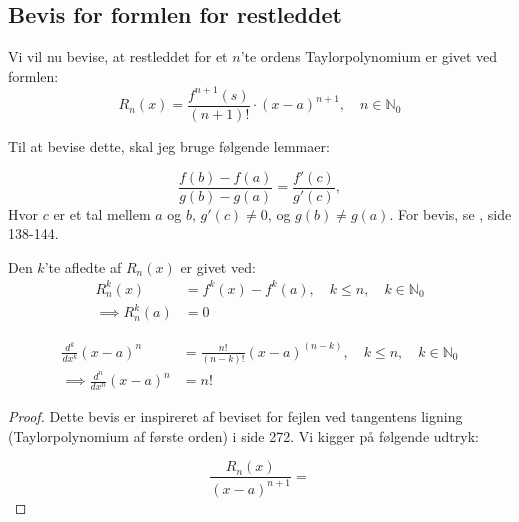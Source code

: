 \subsection{Bevis for formlen for restleddet}
Vi vil nu bevise, at restleddet for et $n$'te ordens Taylorpolynomium er givet ved formlen:
\begin{equation}
	R_n(x)=\frac{f^{n+1}(s)}{(n+1)!} \cdot (x-a)^{n+1}, \quad n \in \mathbb{N}_0
\end{equation}

Til at bevise dette, skal jeg bruge følgende lemmaer:
\begin{lem}
	\begin{equation*}
		\frac{f(b)-f(a)}{g(b)-g(a)}=\frac{f'(c)}{g'(c)},
	\end{equation*}
	Hvor $c$ er et tal mellem $a$ og $b$, $g'(c) \neq 0$, og $g(b) \neq g(a)$. For bevis, se \cite{calc_et}, side 138-144.
\end{lem}
\label{generel_mvs}

\begin{lem}
	Den $k$'te afledte af $R_n(x)$ er givet ved:
	\begin{align*}
		R_n^k(x)&=f^k(x)-f^k(a), \quad k \leq n, \quad k \in \mathbb{N}_0 \\
		\implies R_n^k(a)&=0
	\end{align*}	
\end{lem}
\label{rest_dif}

\begin{lem}
	\begin{align}
		\frac{d^k}{dx^k}(x-a)^n&=\frac{n!}{(n-k)!}(x-a)^{(n-k)}, \quad k \leq n, \quad k \in \mathbb{N}_0 \\
		\implies \frac{d^n}{dx^n}(x-a)^n&=n!
	\end{align}
\end{lem}
\label{potens_dif}

\begin{proof}

Dette bevis er inspireret af beviset for fejlen ved tangentens ligning (Taylorpolynomium af første orden) i \cite{calc_et} side 272. Vi kigger på følgende udtryk:

\begin{equation}
	\frac{R_n(x)}{(x-a)^{n+1}}=
\end{equation}
	
\end{proof}